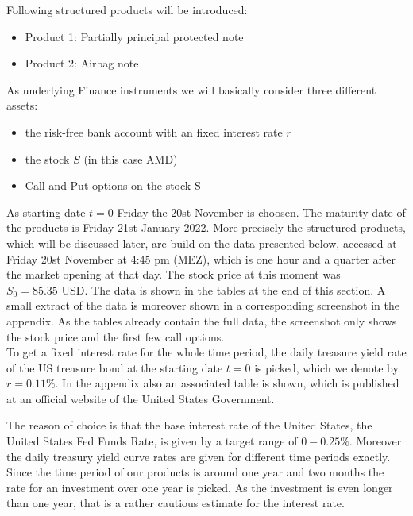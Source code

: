 \documentclass[11pt,oneside,a4paper]{article}
\begin{document}
	Following structured products will be introduced:
	\begin{itemize}
		\item Product 1: Partially principal protected note
		\item Product 2: Airbag note
	\end{itemize}
	As underlying Finance instruments we will basically consider three different assets:
	\begin{itemize}
		\item the risk-free bank account with an fixed interest rate $r$
		\item the stock $ S $ (in this case AMD)
		\item Call and Put options on the stock S
	\end{itemize}
	As starting date $ t=0 $ Friday the 20st November is choosen.
	The maturity date of the products is Friday 21st January 2022.
	More precisely the structured products, which will be discussed later, are build on the data presented below, accessed at Friday 20st November at 4:45 pm (MEZ), which is one hour and a quarter after the market opening at that day. The stock price at this moment was $ S_0=85.35 \text{ USD} $. The data is shown in the tables at the end of this section. A small extract of the data is moreover shown in a corresponding screenshot in the appendix. As the tables already contain the full data, the screenshot only shows the stock price and the first few call options.  \\


	To get a fixed interest rate for the whole time period, the daily treasure yield rate of the US treasure bond at the starting date $ t=0 $ is picked, which we denote by $ r = 0.11 \% $.
	In the appendix also an associated table is shown, which is published at \cite{site_treasure}
    an official website of the United States Government.
   
	
	
	The reason of choice is that the base interest rate of the United States, the United States Fed Funds Rate, is given by a target range of $ 0-0.25 \% $. Moreover the daily treasury yield curve rates are given for different time periods exactly. Since the time period of our products is around one year and two months the rate for an investment over one year is picked. As the investment is even longer than one year, that is a rather cautious estimate for the interest rate.
	
\end{document}
